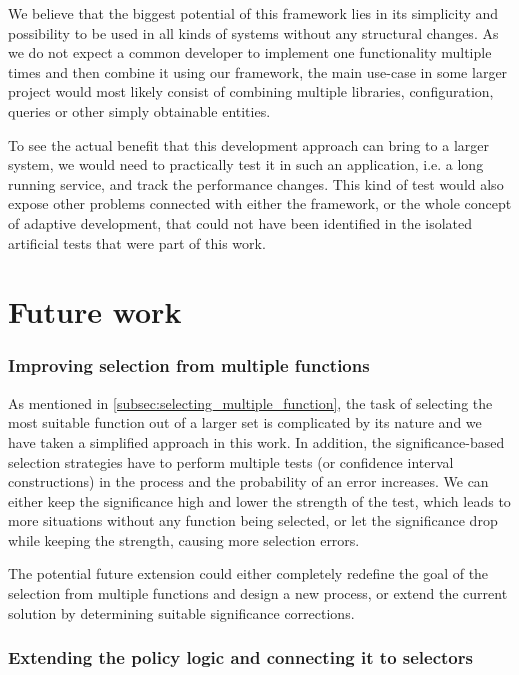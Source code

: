 We believe that the biggest potential of this framework lies in its simplicity and possibility to be used in all kinds of systems without any structural changes. As we do not expect a common developer to implement one functionality multiple times and then combine it using our framework, the main use-case in some larger project would most likely consist of combining multiple libraries, configuration, queries or other simply obtainable entities.

To see the actual benefit that this development approach can bring to a larger system, we would need to practically test it in such an application, i.e. a long running service, and track the performance changes. This kind of test would also expose other problems connected with either the framework, or the whole concept of adaptive development, that could not have been identified in the isolated artificial tests that were part of this work.

\section*{Future work}

\subsubsection{Improving selection from multiple functions}
\label{subsec:problem_selecting_multiple}

As mentioned in \ref{subsec:selecting_multiple_function}, the task of selecting the most suitable function out of a larger set is complicated by its nature and we have taken a simplified approach in this work. In addition, the significance-based selection strategies have to perform multiple tests (or confidence interval constructions) in the process and the probability of an error increases. We can either keep the significance high and lower the strength of the test, which leads to more situations without any function being selected, or let the significance drop while keeping the strength, causing more selection errors.

The potential future extension could either completely redefine the goal of the selection from multiple functions and design a new process, or extend the current solution by determining suitable significance corrections.

\subsubsection{Extending the policy logic and connecting it to selectors}

